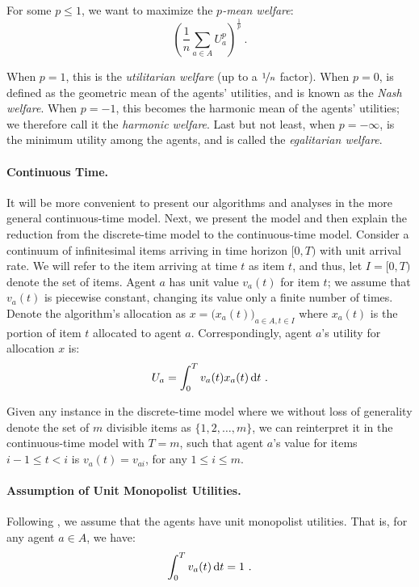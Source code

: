 \documentclass[11pt,letterpaper]{article}
\newcommand{\dif}[1]{\,\text{\rm d} #1}
\newcommand{\utility}{U}
\begin{document}
For some $p \le 1$, we want to maximize the \emph{$p$-mean welfare}:
\begin{equation}
	\label{eqn:p-norm-welfare}
	\left( \frac{1}{n} \sum_{a \in A} \utility_a^p \right)^{\frac{1}{p}}
	~.
\end{equation}

When $p = 1$, this is the \emph{utilitarian welfare} (up to a $\nicefrac{1}{n}$ factor).
When $p = 0$,  is defined as the geometric mean of the agents' utilities, and is known as the \emph{Nash welfare}.
When $p = -1$, this becomes the harmonic mean of the agents' utilities;
we therefore call it the \emph{harmonic welfare}.
Last but not least, when $p = -\infty$,  is the minimum utility among the agents, and is called the \emph{egalitarian welfare}.

\paragraph{Continuous Time.}
It will be more convenient to present our algorithms and analyses in the more general continuous-time model.
Next, we present the model and then explain the reduction from the discrete-time model to the continuous-time model.
Consider a continuum of infinitesimal items arriving in time horizon $[0, T)$ with unit arrival rate.
We will refer to the item arriving at time $t$ as item $t$, and thus, let $I = [0, T)$ denote the set of items.
Agent $a$ has unit value $v_a(t)$ for item $t$; we assume that $v_a(t)$ is piecewise constant, changing its value only a finite number of times.
Denote the algorithm's allocation as $x = \big( x_a(t) \big)_{a \in A, t \in I}$ where $x_a(t)$ is the portion of item $t$ allocated to agent $a$.
Correspondingly, agent $a$'s utility for allocation $x$ is:
\[
	\utility_a = \int_0^T v_a(t) x_a(t) \dif{t}
	~.
\]



Given any instance in the discrete-time model where we without loss of generality denote the set of $m$ divisible items as $\{1, 2, \dots, m\}$, we can reinterpret it in the continuous-time model with $T = m$, such that agent $a$'s value for items $i-1 \le t < i$ is $v_a(t) = v_{ai}$, for any $1 \le i \le m$.


\paragraph{Assumption of Unit Monopolist Utilities.}
Following \cite{BarmanKM:AAAI:2022}, we assume that the agents have unit monopolist utilities.
That is, for any agent $a \in A$, we have:
\[
	\int_0^T v_a(t) \dif{t} = 1
	~.
\]
\end{document}
